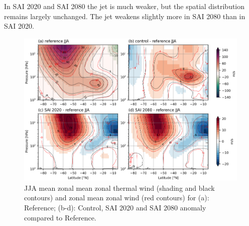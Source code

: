 In SAI 2020 and SAI 2080 the jet is much weaker, but the spatial distribution remains largely unchanged. The jet weakens slightly more in SAI 2080 than in SAI 2020. 


\begin{figure}[H]
	\centering
	\includegraphics[width=0.95\linewidth]{images/UT_U_zmdiff_JJA.png}
	\caption{JJA mean zonal mean zonal thermal wind (shading and black contours) and zonal mean zonal wind (red contours) for (a): Reference; (b-d): Control, SAI 2020 and SAI 2080 anomaly compared to Reference.}
	\label{fig:th_U_zmdiff_JJA}
\end{figure}


